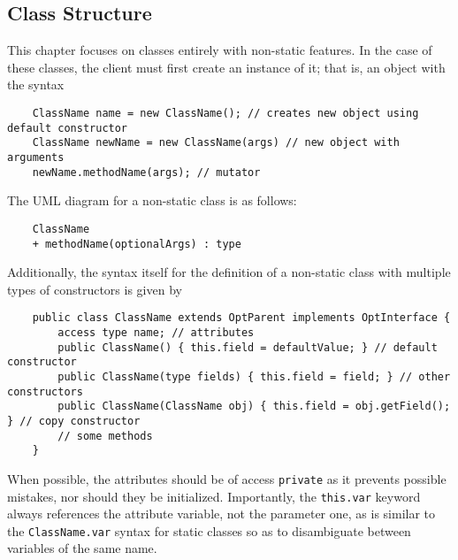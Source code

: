 \documentclass[letterpaper, openany, justified]{tufte-book}
\newcommand{\cd}[1]{\lstinline{#1}}
\begin{document}
\begin{fullwidth}
\section{Class Structure}
This chapter focuses on classes entirely with non-static features. In the case of these classes, the client must first create an instance of it; that is, an object with the syntax
\begin{lstlisting}
    ClassName name = new ClassName(); // creates new object using default constructor
    ClassName newName = new ClassName(args) // new object with arguments
    newName.methodName(args); // mutator
\end{lstlisting}
The UML diagram for a non-static class is as follows:
\begin{lstlisting}
    ClassName
    + methodName(optionalArgs) : type
\end{lstlisting}
Additionally, the syntax itself for the definition of a non-static class with multiple types of constructors is given by
\begin{lstlisting}
    public class ClassName extends OptParent implements OptInterface {
        access type name; // attributes
        public ClassName() { this.field = defaultValue; } // default constructor
        public ClassName(type fields) { this.field = field; } // other constructors
        public ClassName(ClassName obj) { this.field = obj.getField(); } // copy constructor
        // some methods
    }
\end{lstlisting}
When possible, the attributes should be of access \cd{private} as it prevents possible mistakes, nor should they be initialized. Importantly, the \cd{this.var} keyword always references the attribute variable, not the parameter one, as is similar to the \cd{ClassName.var} syntax for static classes so as to disambiguate between variables of the same name.


\end{fullwidth}
\end{document}
